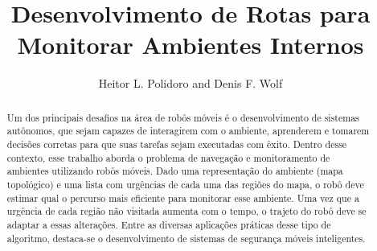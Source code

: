  
%


\title{Desenvolvimento de Rotas para Monitorar Ambientes Internos}

\author{Heitor L. Polidoro and Denis F. Wolf}


\maketitle

\begin{abstract}
Um dos principais desafios na \'{a}rea de rob\^{o}s m\'{o}veis \'{e} o desenvolvimento de sistemas aut\^{o}nomos, que sejam capazes de interagirem com o ambiente, aprenderem e tomarem decis\~{o}es corretas para que suas tarefas sejam executadas com \^{e}xito. Dentro desse contexto, esse trabalho aborda o problema de navega\c{c}\~{a}o e monitoramento de ambientes utilizando rob\^{o}s m\'{o}veis. Dado uma representa\c{c}\~{a}o do ambiente (mapa topol\'{o}gico) e uma lista com urg\^{e}ncias de cada uma das regi\~{o}es do mapa, o rob\^{o} deve estimar qual o percurso mais eficiente para monitorar esse ambiente. Uma vez que a urg\^{e}ncia de cada regi\~{a}o n\~{a}o visitada aumenta com o tempo, o trajeto do rob\^{o} deve se adaptar a essas altera\c{c}\~{o}es. Entre as diversas aplica\c{c}\~{o}es pr\'{a}ticas desse tipo de algoritmo, destaca-se o desenvolvimento de sistemas de seguran\c{c}a m\'{o}veis inteligentes.

\end{abstract}
%

